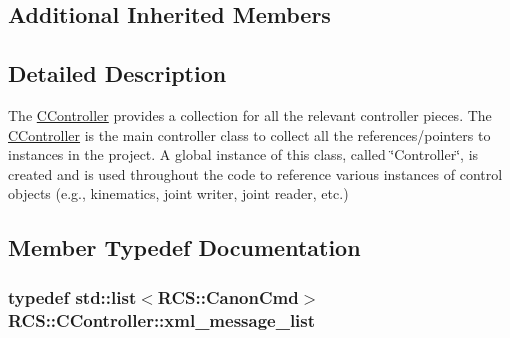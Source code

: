 \subsection*{Additional Inherited Members}


\subsection{Detailed Description}
The \hyperlink{structRCS_1_1CController}{C\-Controller} provides a collection for all the relevant controller pieces. The \hyperlink{structRCS_1_1CController}{C\-Controller} is the main controller class to collect all the references/pointers to instances in the project. A global instance of this class, called \char`\"{}\-Controller\char`\"{}, is created and is used throughout the code to reference various instances of control objects (e.\-g., kinematics, joint writer, joint reader, etc.) 

\subsection{Member Typedef Documentation}
\hypertarget{structRCS_1_1CController_aeaee07d36d39b56ecad1ce2443b5b4c0}{
\subsubsection[{xml\-\_\-message\-\_\-list}]{\setlength{\rightskip}{0pt plus 5cm}typedef std\-::list$<${\bf R\-C\-S\-::\-Canon\-Cmd}$>$ {\bf R\-C\-S\-::\-C\-Controller\-::xml\-\_\-message\-\_\-list}}}\label{structRCS_1_1CController_aeaee07d36d39b56ecad1ce2443b5b4c0}


